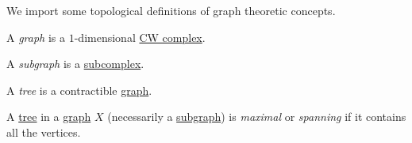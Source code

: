 \begin{definition*}
	We import some topological definitions of graph theoretic concepts.
	\begin{definition}[Graph]\label{def:graph}
		A \emph{graph} is a \(1\)-dimensional \hyperref[def:CW-Complex]{CW complex}.
	\end{definition}
	\begin{definition}[Subgraph]\label{def:subgraph}
		A \emph{subgraph} is a \hyperref[def:CW-subcomplex]{subcomplex}.
	\end{definition}
	\begin{definition}[Tree]\label{def:tree}
		A \emph{tree} is a contractible \hyperref[def:graph]{graph}.
	\end{definition}
	\begin{definition}\label{def:maximal-tree}
		A \hyperref[def:tree]{tree} in a \hyperref[def:graph]{graph} \(X\) (necessarily a \hyperref[def:subgraph]{subgraph}) is
		\emph{maximal} or \emph{spanning} if it contains all the vertices.
	\end{definition}

\end{definition*}


